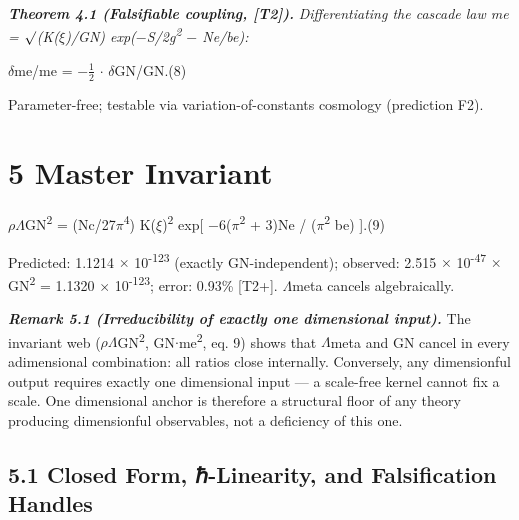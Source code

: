 \documentclass[11pt,letterpaper]{article}
\begin{document}
\noindent \textbf{\textit{Theorem 4.1 (Falsifiable coupling, [T2]). }}\textit{Differentiating the cascade law me = $\surd$(K($\xi$)/GN) exp($-$S/2g\textsuperscript{2} $-$ Ne/be):}

\begingroup\centering $\delta$me/me = $-$$\tfrac{1}{2}$ $\cdot$ $\delta$GN/GN.\hspace{2em}(8)\par\endgroup

\noindent Parameter-free; testable via variation-of-constants cosmology (prediction F2).

\section*{5  Master Invariant}

\begingroup\centering $\rho$$\Lambda$GN\textsuperscript{2} = (Nc/27$\pi$\textsuperscript{4}) K($\xi$)\textsuperscript{2} exp[ $-$6($\pi$\textsuperscript{2} + 3)Ne / ($\pi$\textsuperscript{2} be) ].\hspace{2em}(9)\par\endgroup

\noindent Predicted: 1.1214 $\times$ 10\textsuperscript{-123} (exactly GN-independent); observed: 2.515 $\times$ 10\textsuperscript{-47} $\times$ GN\textsuperscript{2} = 1.1320 $\times$ 10\textsuperscript{-123}; error: 0.93\% [T2+]. $\Lambda$meta cancels algebraically.

\noindent \textbf{\textit{Remark 5.1 (Irreducibility of exactly one dimensional input). }}The invariant web ($\rho$$\Lambda$GN\textsuperscript{2}, GN$\cdot$me\textsuperscript{2}, eq. 9) shows that $\Lambda$meta and GN cancel in every adimensional combination: all ratios close internally. Conversely, any dimensionful output requires exactly one dimensional input --- a scale-free kernel cannot fix a scale. One dimensional anchor is therefore a structural floor of any theory producing dimensionful observables, not a deficiency of this one.

\subsection*{5.1  Closed Form, ℏ-Linearity, and Falsification Handles}
\end{document}
